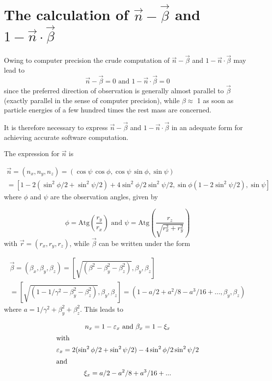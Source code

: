 \section*{The calculation of $\vec{n} - \vec{\beta}$ and $1 - \vec{n} \cdot \vec{\beta}$}
 
Owing to computer precision the crude computation of $\vec{n} -
\vec{\beta}$ and $ 1 -\vec{n}\cdot \vec{\beta}$ may lead to
$$
	\vec{n} - \vec{\beta} = 0 \text{ and } 1 - \vec{n}\cdot \vec{\beta} = 0
$$
since the preferred direction of observation is generally almost parallel to
$\vec{\beta}$ (exactly parallel in the sense of computer precision), while $\beta
\approx$ 1 as soon as particle energies of a few hundred times the rest mass are
concerned.

\noindent It is therefore necessary to express $\vec{n} - \vec{\beta}$ 
and $1 -\vec{n} \cdot
\vec{\beta}$ in an adequate  form for achieving accurate software  computation.

\noindent The expression for $\vec{n}$ is

\begin{multline} \label{eqN4.5}
	\vec{n} = (n_x, n_y, n_z) = (\cos \psi\,\cos \phi, \cos \psi \,\sin 
		\phi, \sin \psi)  \\
	= \left[1 - 2 (\sin^2\phi/2 + \sin^2 \psi/2) + 4 \sin^2\phi/2 \sin^2\psi/2, 
		\sin \phi (1 - 2\sin^2\psi/2), \sin \psi \right]
\end{multline}
%
where $\phi$ and $\psi$ are the observation angles, given by 

\begin{equation}
	\phi = \text{Atg} \left( \frac{r_y}{ r_x}\right)
	\text{ and }  \psi = \text{Atg}\left( \frac{r_z}{\sqrt{r_x^2 + r_y^2}}\right) \label{eqN4.6}
\end{equation} %
%
with $\vec{r} = (r_x, r_y, r_z)$, while $\vec{\beta}$ can be written under the form

\begin{multline} \label{eqN4.7}
	\vec{\beta} = (\beta_x, \beta_y, \beta_z) = 
		\left[ \sqrt{(\beta^2 - \beta^2_y - \beta_z^2)},\beta_y, \beta_z 
		\right] \\
	= \left[ \sqrt{(1 - 1/\gamma^2 - \beta_y^2 - \beta_z^2)}, \beta_y, 
		\beta_z \right] = (1 - a/2 + a^2/8 - a^3/16 +...,\beta_y, \beta_z) 
\end{multline}
%
where $a = 1/ \gamma^2 + \beta^2_y + \beta^2_z$. This leads to

\begin{gather*}
	n_x = 1 - \varepsilon_x 
		\text{ and } \beta_x = 1 - \xi_x  \\
\intertext{with}
\varepsilon_x = 2 (\sin^2\phi/2 + \sin^2\psi/2) - 4 \sin^2\phi/2  \sin^2\psi/2 \\
\intertext{and}
\xi_x = a/2 - a^2/8 + a^3/16 +...
\end{gather*}

